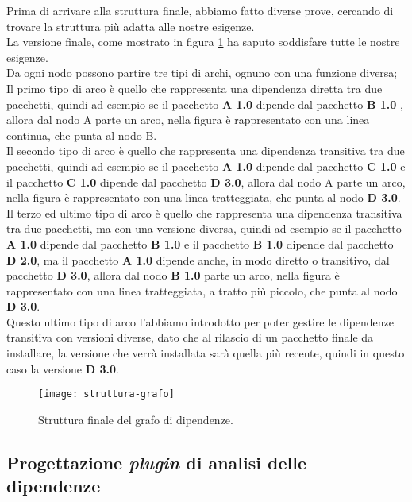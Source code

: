 Prima di arrivare alla struttura finale, abbiamo fatto diverse prove, cercando di trovare la struttura più adatta alle nostre esigenze.\\
La versione finale, come mostrato in figura \ref{fig:struttura-grafo} ha saputo soddisfare tutte le nostre esigenze.\\
Da ogni nodo possono partire tre tipi di archi, ognuno con una funzione diversa; Il primo tipo di arco è quello che rappresenta 
una dipendenza diretta tra due pacchetti, quindi ad esempio se il pacchetto \textbf{A 1.0} dipende dal pacchetto \textbf{B 1.0 }, 
allora dal nodo A parte un arco, nella figura è rappresentato con una linea continua, che punta al nodo B.\\
Il secondo tipo di arco è quello che rappresenta una dipendenza transitiva tra due pacchetti, quindi ad esempio se il pacchetto
\textbf{A 1.0} dipende dal pacchetto \textbf{C 1.0} e il pacchetto \textbf{C 1.0} dipende dal pacchetto \textbf{D 3.0},
allora dal nodo A parte un arco, nella figura è rappresentato con una linea tratteggiata, che punta al nodo \textbf{D 3.0}.\\
Il terzo ed ultimo tipo di arco è quello che rappresenta una dipendenza transitiva tra due pacchetti, ma con una versione diversa,
quindi ad esempio se il pacchetto \textbf{A 1.0} dipende dal pacchetto \textbf{B 1.0} e il pacchetto \textbf{B 1.0} dipende dal pacchetto 
\textbf{D 2.0}, ma il pacchetto \textbf{A 1.0} dipende anche, in modo diretto o transitivo, dal pacchetto \textbf{D 3.0}, 
allora dal nodo \textbf{B 1.0} parte un arco, nella figura è rappresentato con una linea tratteggiata, a tratto più piccolo, 
che punta al nodo \textbf{D 3.0}.\\
Questo ultimo tipo di arco l'abbiamo introdotto per poter gestire le dipendenze transitiva con versioni diverse, dato che al rilascio di un
pacchetto finale da installare, la versione che verrà installata sarà quella più recente, quindi in questo caso la versione \textbf{D 3.0}.\\

\begin{figure}[!h] 
  \centering 
  \texttt{[image: struttura-grafo]} 
  \caption{Struttura finale del grafo di dipendenze.}
  \label{fig:struttura-grafo}
\end{figure}

\subsection*{Progettazione \textit{plugin} di analisi delle dipendenze}

